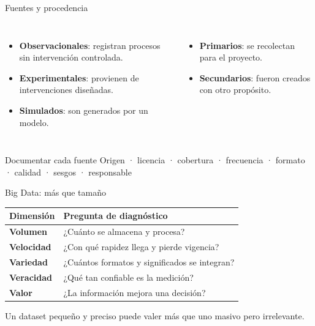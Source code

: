 \documentclass[aspectratio=169,11pt]{beamer}
\newcommand{\concepto}[1]{\textcolor{UAPTeal}{\textbf{#1}}}
\begin{document}
\begin{frame}{Fuentes y procedencia}
  \begin{columns}[T]
      \begin{itemize}
        \item \concepto{Observacionales}: registran procesos sin intervención controlada.
        \item \concepto{Experimentales}: provienen de intervenciones diseñadas.
        \item \concepto{Simulados}: son generados por un modelo.
      \end{itemize}
      \begin{itemize}
        \item \concepto{Primarios}: se recolectan para el proyecto.
        \item \concepto{Secundarios}: fueron creados con otro propósito.
      \end{itemize}
  \end{columns}
  \vfill
  \begin{block}{Documentar cada fuente}
    Origen · licencia · cobertura · frecuencia · formato · calidad · sesgos · responsable
  \end{block}
\end{frame}

\begin{frame}{Big Data: más que tamaño}
  \small
  \begin{tabularx}{\textwidth}{>{\bfseries}p{} X}
    \toprule
    Dimensión & Pregunta de diagnóstico \\
    \midrule
    Volumen & ¿Cuánto se almacena y procesa? \\
    Velocidad & ¿Con qué rapidez llega y pierde vigencia? \\
    Variedad & ¿Cuántos formatos y significados se integran? \\
    Veracidad & ¿Qué tan confiable es la medición? \\
    Valor & ¿La información mejora una decisión? \\
    \bottomrule
  \end{tabularx}
  \vfill
  \centering\alert{Un dataset pequeño y preciso puede valer más que uno masivo pero irrelevante.}
\end{frame}
\end{document}

